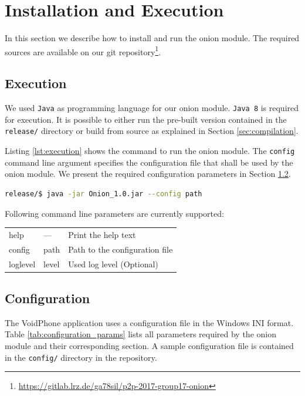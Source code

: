 \documentclass[paper=letter, fontsize=12pt]{article}
\begin{document}
\section{Installation and Execution}
In this section we describe how to install and run the onion module.
The required sources are available on our git repository\footnote{\url{https://gitlab.lrz.de/ga78sil/p2p-2017-group17-onion}}.

\subsection{Execution}
We used \texttt{Java} as programming language for our onion module.
\texttt{Java 8} is required for execution.
It is possible to either run the pre-built version contained in the \texttt{release/} directory or build from source as explained in Section \ref{sec:compilation}.


Listing \ref{lst:execution} shows the command to run the onion module.
The \texttt{config} command line argument specifies the configuration file that shall be used by the onion module.
We present the required configuration parameters in Section \ref{sec:configuration}.

\begin{lstlisting}[language=bash, caption=Command to execute the onion module, label=lst:execution]
release/$ java -jar Onion_1.0.jar --config path
\end{lstlisting}

\noindent
Following command line parameters are currently supported:

\begin{table}[H]
    \centering
    \begin{tabular}{l l p{5cm}}
        help        & ---   & Print the help text \\
        config      & path  & Path to the configuration file \\
        loglevel    & level & Used log level (Optional) \\
    \end{tabular}
\end{table}

\subsection{Configuration} \label{sec:configuration}
The VoidPhone application uses a configuration file in the Windows INI format.
Table \ref{tab:configuration_params} lists all parameters required by the onion module and their corresponding section.
A sample configuration file is contained in the \texttt{config/} directory in the repository.
\end{document}
